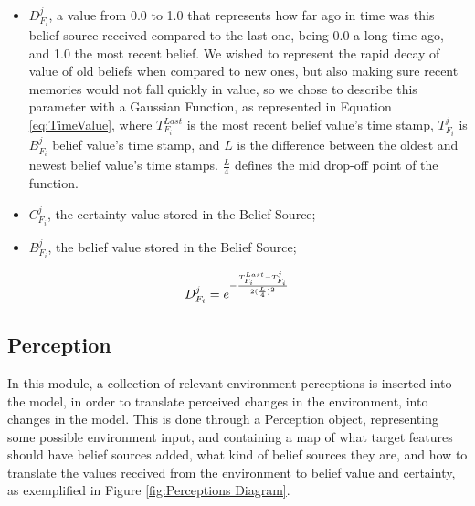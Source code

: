 \begin{itemize}
    \item $D^j_{F_i}$, a value from 0.0 to 1.0 that represents how far ago in time was this belief source received compared to the last one, being 0.0 a long time ago, and 1.0 the most recent belief. We wished to represent the rapid decay of value of old beliefs when compared to new ones, but also making sure recent memories would not fall quickly in value, so we chose to describe this parameter with a Gaussian Function, as represented in Equation \ref{eq:TimeValue}, where $T^{Last}_{F_i}$ is the most recent belief value's time stamp, $T^j_{F_i}$ is $B_{F_i}^j$ belief value's time stamp, and $L$ is the difference between the oldest and newest belief value's time stamps. $\frac{L}{4}$ defines the mid drop-off point of the function.
    \item $C^j_{F_i}$, the certainty value stored in the Belief Source;
    \item $B^j_{F_i}$, the belief value stored in the Belief Source;
\end{itemize}

\begin{equation}
D^j_{F_i} = e^{-\frac{T^{Last}_{F_i} - T^j_{F_i}}{2(\frac{L}{4})^2}}
\label{eq:TimeValue}
\end{equation}


% 

\subsection{Perception}
In this module, a collection of relevant environment perceptions is inserted into the model, in order to translate perceived changes in the environment, into changes in the model. This is done through a Perception object, representing some possible environment input, and containing a map of what target features should have belief sources added, what kind of belief sources they are, and how to translate the values received from the environment to belief value and certainty, as exemplified in Figure \ref{fig:Perceptions Diagram}.

